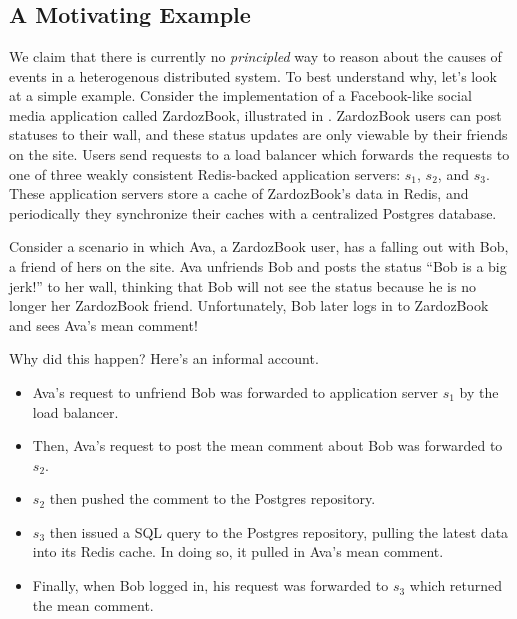 \section{\WatProvenance{}}

\subsection{A Motivating Example}
\newcommand{\systemname}{ZardozBook} We claim that there is currently no
\emph{principled} way to reason about the causes of events in a heterogenous
distributed system. To best understand why, let's look at a simple example.
Consider the implementation of a Facebook-like social media application called
\systemname{}, illustrated in . \systemname{} users can
post statuses to their wall, and these status updates are only viewable by
their friends on the site. Users send requests to a load balancer which
forwards the requests to one of three weakly consistent Redis-backed
application servers: $s_1$, $s_2$, and $s_3$. These application servers store a
cache of \systemname{}'s data in Redis, and periodically they synchronize their
caches with a centralized Postgres database.

Consider a scenario in which Ava, a \systemname{} user, has a falling out with
Bob, a friend of hers on the site. Ava unfriends Bob and posts the status ``Bob
is a big jerk!'' to her wall, thinking that Bob will not see the status because
he is no longer her \systemname{} friend. Unfortunately, Bob later logs in to
\systemname{} and sees Ava's mean comment!

{}

Why did this happen? Here's an informal account.
\begin{itemize}
  \item
    Ava's request to unfriend Bob was forwarded to application server $s_1$ by
    the load balancer.
  \item
    Then, Ava's request to post the mean comment about Bob was forwarded to
    $s_2$.
  \item
    $s_2$ then pushed the comment to the Postgres repository.
  \item
    $s_3$ then issued a SQL query to the Postgres repository, pulling the
    latest data into its Redis cache. In doing so, it pulled in Ava's mean
    comment.
  \item
    Finally, when Bob logged in, his request was forwarded to $s_3$ which
    returned the mean comment.
\end{itemize}


